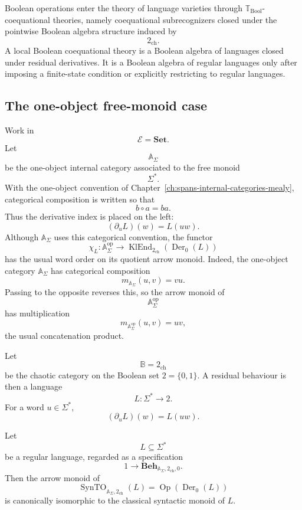 Boolean operations enter the theory of language varieties through
\(\mathbb T_{\mathrm{Bool}}\)-coequational theories, namely coequational
subrecognizers closed under the pointwise Boolean algebra structure induced by
\[
    2_{\mathrm{ch}}.
\]
A local Boolean coequational theory is a Boolean algebra of languages closed
under residual derivatives. It is a Boolean algebra of regular languages only
after imposing a finite-state condition or explicitly restricting to regular
languages.

\subsection{The one-object free-monoid case}
\label{subsec:free-monoid-specialization}

Work in
\[
    \mathcal E=\mathbf{Set}.
\]
Let
\[
    \mathbb A_\Sigma
\]
be the one-object internal category associated to the free monoid
\[
    \Sigma^*.
\]
With the one-object convention of
Chapter~\ref{ch:spans-internal-categories-mealy}, categorical composition is
written so that
\[
    b\circ a=ba.
\]
Thus the derivative index is placed on the left:
\[
    (\partial_uL)(w)=L(uw).
\]
Although \(\mathbb A_\Sigma\) uses this categorical convention, the functor
\[
    \chi_L:
    \mathbb A_\Sigma^{\mathrm{op}}
    \to
    \operatorname{KlEnd}_{2_{\mathrm{ch}}}(\operatorname{Der}_0(L))
\]
has the usual word order on its quotient arrow monoid. Indeed, the one-object
category \(\mathbb A_\Sigma\) has categorical composition
\[
    m_{\mathbb A_\Sigma}(u,v)=vu.
\]
Passing to the opposite reverses this, so the arrow monoid of
\[
    \mathbb A_\Sigma^{\mathrm{op}}
\]
has multiplication
\[
    m_{\mathbb A_\Sigma^{\mathrm{op}}}(u,v)=uv,
\]
the usual concatenation product.

Let
\[
    \mathbb B=2_{\mathrm{ch}}
\]
be the chaotic category on the Boolean set \(2=\{0,1\}\). A residual behaviour
is then a language
\[
    L:\Sigma^*\to 2.
\]
For a word \(u\in\Sigma^*\),
\[
    (\partial_uL)(w)=L(uw).
\]

\begin{proposition}
\label{prop:classical-syntactic-monoid-recovery}
    Let
    \[
        L\subseteq\Sigma^*
    \]
    be a regular language, regarded as a specification
    \[
        1\to\mathbf{Beh}_{\mathbb A_\Sigma,2_{\mathrm{ch}},0}.
    \]
    Then the arrow monoid of
    \[
        \operatorname{SynTO}_{\mathbb A_\Sigma,2_{\mathrm{ch}}}(L)
        =
        \operatorname{Op}(\operatorname{Der}_0(L))
    \]
    is canonically isomorphic to the classical syntactic monoid of \(L\).
\end{proposition}

